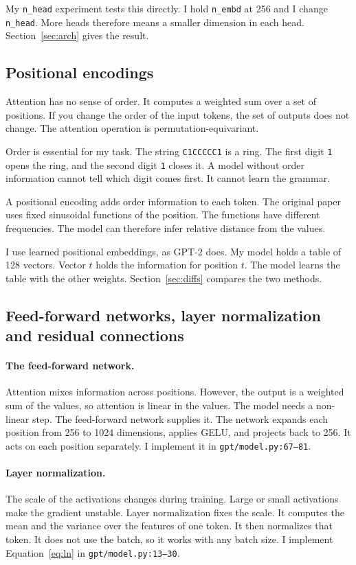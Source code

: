 \documentclass[11pt,a4paper]{article}
\newcommand{\code}[1]{\texttt{#1}}
\begin{document}
My \code{n\_head} experiment tests this directly. I hold \code{n\_embd} at 256 and I change
\code{n\_head}. More heads therefore means a smaller dimension in each head.
Section~\ref{sec:arch} gives the result.

\subsection{Positional encodings}

Attention has no sense of order. It computes a weighted sum over a set of positions. If you
change the order of the input tokens, the set of outputs does not change. The attention operation
is permutation-equivariant.

Order is essential for my task. The string \code{C1CCCCC1} is a ring. The first digit \code{1}
opens the ring, and the second digit \code{1} closes it. A model without order information cannot
tell which digit comes first. It cannot learn the grammar.

A positional encoding adds order information to each token. The original paper uses fixed
sinusoidal functions of the position. The functions have different frequencies. The model can
therefore infer relative distance from the values.

I use learned positional embeddings, as GPT-2 does. My model holds a table of 128 vectors. Vector
$t$ holds the information for position $t$. The model learns the table with the other weights.
Section~\ref{sec:diffs} compares the two methods.

\subsection{Feed-forward networks, layer normalization and residual connections}

\paragraph{The feed-forward network.} Attention mixes information across positions. However, the
output is a weighted sum of the values, so attention is linear in the values. The model needs a
non-linear step. The feed-forward network supplies it. The network expands each position from 256
to 1024 dimensions, applies GELU, and projects back to 256. It acts on each position separately.
I implement it in \code{gpt/model.py:67--81}.

\paragraph{Layer normalization.} The scale of the activations changes during training. Large or
small activations make the gradient unstable. Layer normalization fixes the scale. It computes the
mean and the variance over the features of one token. It then normalizes that token. It does not
use the batch, so it works with any batch size. I implement Equation~\ref{eq:ln} in
\code{gpt/model.py:13--30}.
\end{document}
